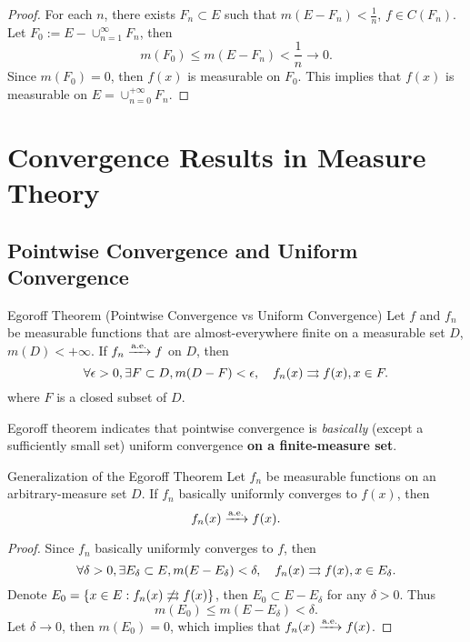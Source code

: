 \begin{proof}
  For each $n$, there exists $F_n \subset E$ such that $m(E - F_n) < \frac{1}{n}$,
  $f \in C(F_n)$.
  Let $F_0 := E - \cup _{n = 1}^{\infty}F_n$, then
  \begin{equation}
    m(F_0) \leq m (E - F_n) < \frac{1}{n} \rightarrow 0.
  \end{equation}
  Since $m(F_0) = 0$, then $f(x)$ is measurable on $F_0$.
  This implies that $f(x)$ is measurable on $E = \cup _{n = 0}^{+\infty}F_n$.
\end{proof}

\section{Convergence Results in Measure Theory}

\subsection{Pointwise Convergence and Uniform Convergence}

\begin{theorem}{Egoroff Theorem (Pointwise Convergence vs Uniform Convergence)}{}
  Let $f$ and $f_n$ be measurable functions that are almost-everywhere finite
  on a measurable set $D$, $m(D) < +\infty$.
  If $f_n \xrightarrow{\text{a.e.}} f$ on $D$,
  then
  \begin{equation}
    \forall \epsilon > 0, \exists F \subset D, m(D - F) < \epsilon, \quad
    f_n(x) \rightrightarrows f(x), x \in F.
  \end{equation}
  where $F$ is a closed subset of $D$.
\end{theorem}

\begin{note}
  Egoroff theorem indicates that pointwise convergence is
  \emph{basically} (except a sufficiently small set) uniform convergence
  \textbf{on a finite-measure set}.
\end{note}

\begin{example}{Generalization of the Egoroff Theorem}{}
  Let $f_n$ be measurable functions on an arbitrary-measure set $D$.
  If $f_n$ basically uniformly converges to $f(x)$, then
  \begin{equation}
    f_n(x) \xrightarrow{\text{a.e.}} f(x).
  \end{equation}
\end{example}

\begin{proof}
  Since $f_n$ basically uniformly converges to $f$, then
  \begin{equation}
    \forall \delta > 0, \exists E_{\delta} \subset E, m(E - E_{\delta}) < \delta,
    \quad f_n(x) \rightrightarrows f(x), x \in E_{\delta}.
  \end{equation}
  Denote $E_0 = \{x \in E: f_n(x) \not \rightrightarrows f(x)\}$, then $E_0 \subset E - E_{\delta}$ for any $\delta > 0$.
  Thus
  \begin{equation}
    m(E_0) \leq m(E - E_{\delta}) < \delta.
  \end{equation}
  Let $\delta \rightarrow 0$, then $m(E_0) = 0$, which implies that $f_n(x) \xrightarrow{\text{a.e.}} f(x)$.
\end{proof}

